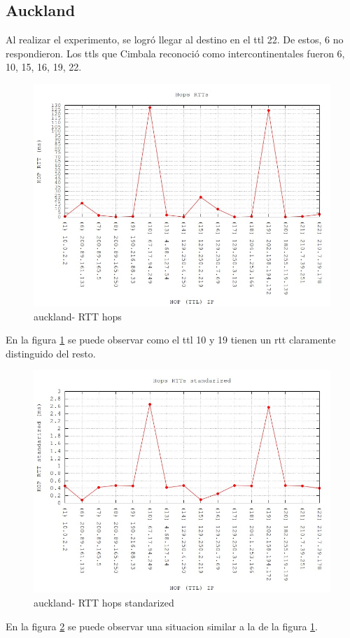 \subsection{Auckland}

Al realizar el experimento, se logró llegar al destino en el ttl 22. De estos, 6 no respondieron. Los ttls que Cimbala reconoció como intercontinentales fueron 6, 10, 15, 16, 19, 22.

\begin{figure}[h!]
  \centering
    \includegraphics[scale=0.6]{imagenes/auckland-graficos/traceroute-auckland.jpg}
  \caption{auckland- RTT hops}
  \label{fig:7}
\end{figure}

En la figura \ref{fig:7} se puede observar como el ttl 10 y 19 tienen un rtt claramente distinguido del resto.

\begin{figure}[h!]
  \centering
    \includegraphics[scale=0.6]{imagenes/auckland-graficos/traceroute-auckland-standarized.jpg}
  \caption{auckland- RTT hops standarized}
  \label{fig:8}
\end{figure}

En la figura \ref{fig:8} se puede observar una situacion similar a la de la figura \ref{fig:7}.


